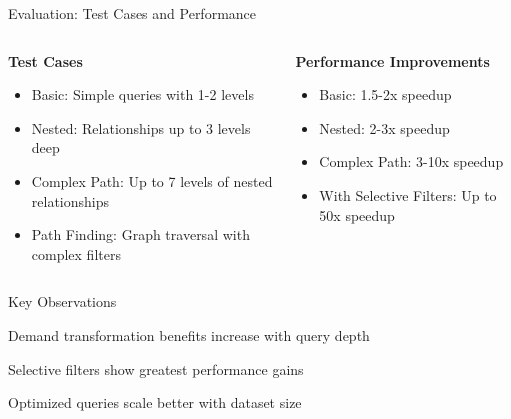\documentclass{beamer}
\begin{document}
\begin{frame}{Evaluation: Test Cases and Performance}
  \begin{columns}[T]
    \begin{column}{0.48\textwidth}
      \textbf{Test Cases}
      \begin{itemize}
        \item Basic: Simple queries with 1-2 levels
        \item Nested: Relationships up to 3 levels deep
        \item Complex Path: Up to 7 levels of nested relationships
        \item Path Finding: Graph traversal with complex filters
      \end{itemize}
    \end{column}
    \begin{column}{0.48\textwidth}
      \textbf{Performance Improvements}
      \begin{itemize}
        \item Basic: 1.5-2x speedup
        \item Nested: 2-3x speedup 
        \item Complex Path: 3-10x speedup
        \item With Selective Filters: Up to 50x speedup
      \end{itemize}
    \end{column}
  \end{columns}
  
  \begin{block}{Key Observations}
    \item Demand transformation benefits increase with query depth
    \item Selective filters show greatest performance gains
    \item Optimized queries scale better with dataset size
  \end{block}
\end{frame}

\end{document}
